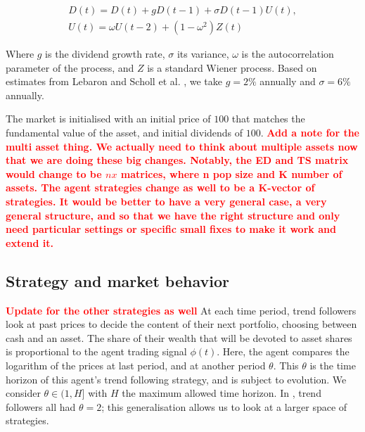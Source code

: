 \documentclass{article}
\newcommand\boldred[1]{\textcolor{red}{\textbf{#1}}}
\begin{document}
\begin{equation}
    \label{dividend_equation}
    \begin{array}{l}
{D}(t)={D}(t)+g {D}(t-1)+\sigma {D}(t-1) {U}(t), \\
{U}(t)=\omega U(t-2)+\left(1-\omega^{2}\right){Z}(t)
\end{array}
\end{equation}

Where $g$ is the dividend growth rate, $\sigma$ its variance, $\omega$ is the autocorrelation parameter of the process, and $Z$ is a standard Wiener process. Based on estimates from Lebaron \cite{lebaron2001empirical} and Scholl et al. \cite{scholl2020market}, we take $g=2\%$ annually and $\sigma = 6\%$ annually. \par
The market is initialised with an initial price of $100$ that matches the fundamental value of the asset, and initial dividends of $100$. 
\boldred{Add a note for the multi asset thing. We actually need to think about multiple assets now that we are doing these big changes. Notably, the ED and TS matrix would change to be $nx$ matrices, where n pop size and K number of assets. The agent strategies change as well to be a K-vector of strategies. It would be better to have a very general case, a very general structure, and so that we have the right structure and only need particular settings or specific small fixes to make it work and extend it.}

\subsection{Strategy and market behavior}
\boldred{Update for the other strategies as well}
At each time period, trend followers look at past prices to decide the content of their next portfolio, choosing between cash and an asset. The share of their wealth that will be devoted to asset shares is proportional to the agent trading signal $\phi(t)$. Here, the agent compares the logarithm of the prices at last period, and at another period $\theta$. This $\theta$ is the time horizon of this agent's trend following strategy, and is subject to evolution. We consider $\theta \in (1, H]$ with $H$ the maximum allowed time horizon. In \cite{scholl2020market}, trend followers all had $\theta = 2$; this generalisation allows us to look at a larger space of strategies.
\end{document}
